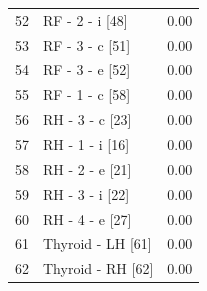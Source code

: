 \documentclass[11pt,a4paper]{article}
\begin{document}
\begin{longtable}{@{}rlr@{}}
    52 & RF - 2 - i [48] & 0.00 \\
    53 & RF - 3 - c [51] & 0.00 \\
    54 & RF - 3 - e [52] & 0.00 \\
    55 & RF - 1 - c [58] & 0.00 \\
    56 & RH - 3 - c [23] & 0.00 \\
    57 & RH - 1 - i [16] & 0.00 \\
    58 & RH - 2 - e [21] & 0.00 \\
    59 & RH - 3 - i [22] & 0.00 \\
    60 & RH - 4 - e [27] & 0.00 \\
    61 & Thyroid - LH [61] & 0.00 \\
    62 & Thyroid - RH [62] & 0.00 \\
\end{longtable}
\end{document}
